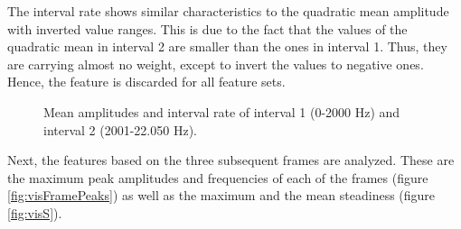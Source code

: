 The interval rate shows similar characteristics to the quadratic mean amplitude with inverted value ranges. This is due to the fact that the values of the quadratic mean in interval 2 are smaller than the ones in interval 1. Thus, they are carrying almost no weight, except to invert the values to negative ones. Hence, the feature is discarded for all feature sets.

\begin{figure}[tp]
	\centering
	\caption{Mean amplitudes and interval rate of interval 1 (0-2000 Hz) and interval 2 (2001-22.050 Hz).}
	\label{fig:visIntervalFeatures2}
\end{figure}

Next, the features based on the three subsequent frames are analyzed. These are the maximum peak amplitudes and frequencies of each of the frames (figure \ref{fig:visFramePeaks}) as well as the maximum and the mean steadiness (figure \ref{fig:visS}).

